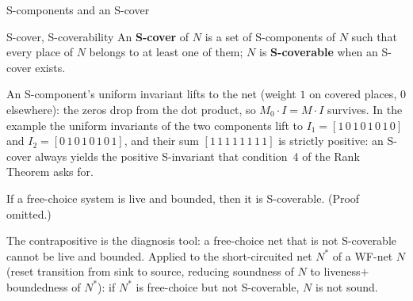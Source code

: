 \begin{examplebox}{S-components and an S-cover}
\end{examplebox}
\begin{definitionbox}{S-cover, S-coverability}
An \textbf{S-cover} of $N$ is a set of S-components of $N$ such that every place of $N$ belongs to at least one of them; $N$ is \textbf{S-coverable} when an S-cover exists.
\end{definitionbox}
An S-component's uniform invariant lifts to the net (weight $1$ on covered places, $0$ elsewhere): the zeros drop from the dot product, so $M_0 \cdot I = M \cdot I$ survives. In the example the uniform invariants of the two components lift to $I_1 = [1\,0\,1\,0\,1\,0\,1\,0]$ and $I_2 = [0\,1\,0\,1\,0\,1\,0\,1]$, and their sum $[1\,1\,1\,1\,1\,1\,1\,1]$ is strictly positive: an S-cover always yields the positive S-invariant that condition~4 of the Rank Theorem asks for.

\begin{theorem}[S-coverability, 1]
If a free-choice system is live and bounded, then it is S-coverable. (Proof omitted.)
\end{theorem}
The contrapositive is the diagnosis tool: a free-choice net that is not S-coverable cannot be live and bounded. Applied to the short-circuited net $N^{*}$ of a WF-net $N$ (reset transition from sink to source, reducing soundness of $N$ to liveness$+$boundedness of $N^{*}$): if $N^{*}$ is free-choice but not S-coverable, $N$ is not sound.

